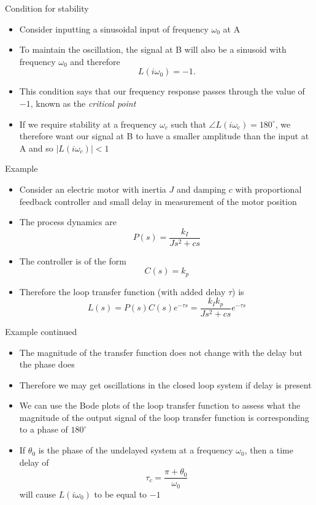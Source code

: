 \documentclass{beamer-control}
\begin{document}
\begin{frame}{Condition for stability}
	
\begin{itemize}
	\item Consider inputting a sinusoidal input of frequency $\omega_0$ at A
	\item To maintain the oscillation, the signal at B will also be a sinusoid with frequency $\omega_0$ and therefore
	\[L(i\omega_0)=-1.\]
	\item This condition says that our frequency response passes through the value of $-1$, known as the \textit{critical point}
	\item If we require stability at a frequency $\omega_c$ such that $\angle L\left(i \omega_{\mathrm{c}}\right)=180^{\circ}$, we therefore want our signal at B to have a smaller amplitude than the input at A and so $|L(i\omega_c)|<1$
\end{itemize}
\end{frame}



\begin{frame}{Example}
\begin{itemize}
\item Consider an electric motor with inertia $J$ and damping $c$ with proportional feedback controller and small delay in measurement of the motor position
\item The process dynamics are 
\[P(s) = \frac{k_I}{Js^2+cs}\]
\item The controller is of the form
\[C(s) = k_p\]
\item Therefore the loop transfer function (with added delay $\tau$) is 
\[L(s) = P(s) C(s) e^{-\tau s} = \frac{k_Ik_p}{Js^2+cs}e^{-\tau s}\]
\end{itemize}
\end{frame}

\begin{frame}{Example continued}
\begin{itemize}
\item The magnitude of the transfer function does not change with the delay but the phase does
\item Therefore we may get oscillations in the closed loop system if delay is present
\item We can use the Bode plots of the loop transfer function to assess what the magnitude of the output signal of the loop transfer function is corresponding to a phase of $180^\circ$
\item If $\theta_0$ is the phase of the undelayed system at a frequency $\omega_0$, then a time delay of 
\[\tau_c=\frac{\pi+\theta_0}{\omega_0}\]
will cause $L(i\omega_0)$ to be equal to $-1$
\end{itemize}
\end{frame}
\end{document}
